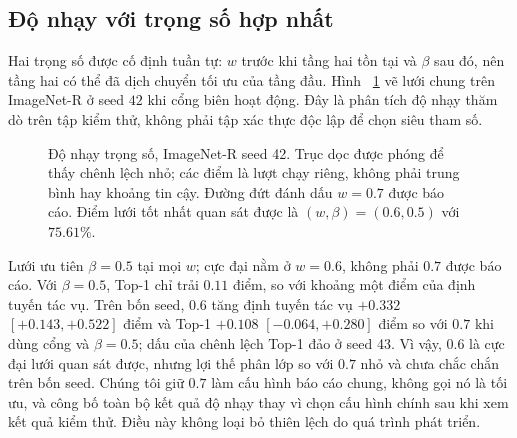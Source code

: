 \documentclass[runningheads]{llncs}
\begin{document}
\subsection{Độ nhạy với trọng số hợp nhất}
\label{sec:weights}

Hai trọng số được cố định tuần tự: $w$ trước khi tầng hai tồn tại và $\beta$
sau đó, nên tầng hai có thể đã dịch chuyển tối ưu của tầng đầu. Hình
~\ref{fig:weights} vẽ lưới chung trên ImageNet-R ở seed $42$ khi cổng biên hoạt
động. Đây là phân tích độ nhạy thăm dò trên tập kiểm thử, không phải tập xác
thực độc lập để chọn siêu tham số.

\begin{figure}[htbp]
\centering
{}
\caption{Độ nhạy trọng số, ImageNet-R seed 42. Trục dọc được phóng để thấy
chênh lệch nhỏ; các điểm là lượt chạy riêng, không phải trung bình hay khoảng
tin cậy. Đường đứt đánh dấu $w=0.7$ được báo cáo. Điểm lưới tốt nhất quan sát
được là $(w,\beta)=(0.6,0.5)$ với $75.61\%$.}
\label{fig:weights}
\end{figure}

Lưới ưu tiên $\beta=0.5$ tại mọi $w$; cực đại nằm ở $w=0.6$, không phải $0.7$
được báo cáo. Với $\beta=0.5$, Top-1 chỉ trải $0.11$ điểm, so với khoảng một
điểm của định tuyến tác vụ. Trên bốn seed, $0.6$ tăng định tuyến tác vụ
$+0.332$ $[+0.143,+0.522]$ điểm và Top-1 $+0.108$ $[-0.064,+0.280]$ điểm so
với $0.7$ khi dùng cổng và $\beta=0.5$; dấu của chênh lệch Top-1 đảo ở seed 43.
Vì vậy,
$0.6$ là cực đại lưới quan sát được, nhưng lợi thế phân lớp so với $0.7$ nhỏ
và chưa chắc chắn trên bốn seed. Chúng tôi giữ $0.7$ làm cấu hình báo cáo chung,
không gọi nó là tối ưu, và công bố toàn bộ kết quả độ nhạy thay vì chọn cấu
hình chính sau khi xem kết quả kiểm thử. Điều này không loại bỏ thiên lệch do
quá trình phát triển.
\end{document}
